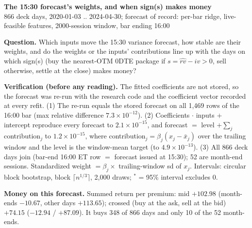 \documentclass[10pt]{article}
\begin{document}
\begin{center}{\large\bf The 15:30 forecast's weights, and when sign(s) makes money}\\[2pt]
{\small 866 deck days, 2020-01-03 .. 2024-04-30; forecast of record: per-bar ridge, live-feasible features, 2000-session window, bar ending 16:00}\end{center}

\textbf{Question.} Which inputs move the 15:30 variance forecast, how stable are their weights, and do the weights or the inputs' contributions line up with the days on which sign(s) (buy the nearest-OTM 0DTE package if $s=\hat{rv}-iv>0$, sell otherwise, settle at the close) makes money?

\textbf{Verification (before any reading).} The fitted coefficients are not stored, so the forecast was re-run with the research code and the coefficient vector recorded at every refit.
(1) The re-run equals the stored forecast on all 1,469 rows of the 16:00 bar (max relative difference $7.3\times10^{-12}$).
(2) Coefficients $\cdot$ inputs $+$ intercept reproduce every forecast to $2.1\times10^{-15}$, and forecast $=$ level $+\sum_j$ contribution$_j$ to $1.2\times10^{-15}$, where contribution$_j=\beta_j(x_j-\bar x_j)$ over the trailing window and the level is the window-mean target (to $4.9\times10^{-13}$).
(3) All 866 deck days join (bar-end 16:00 ET row $=$ forecast issued at 15:30); 52 are month-end sessions.
Standardized weight $=\beta_j\times$ trailing-window sd of $x_j$. Intervals: circular block bootstrap, block $\lceil n^{1/3}\rceil$, 2,000 draws; $^{*}$ = 95\% interval excludes 0.

\textbf{Money on this forecast.} Summed return per premium: mid $+102.98$ (month-ends $-10.67$, other days $+113.65$); crossed (buy at the ask, sell at the bid) $+74.15$ ($-12.94$ / $+87.09$). It buys 348 of 866 days and only 10 of the 52 month-ends.
\end{document}
